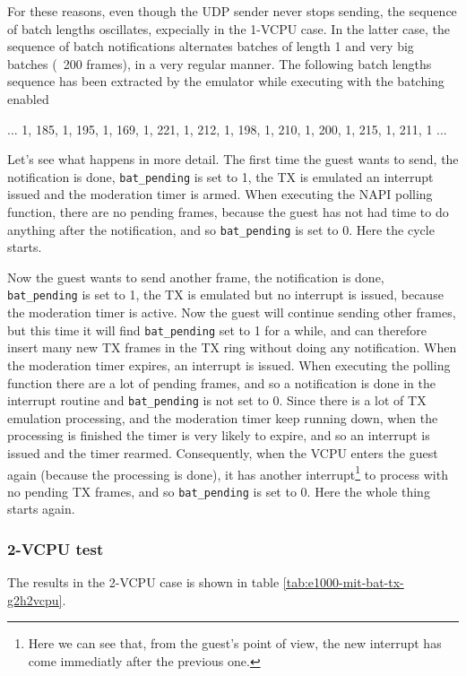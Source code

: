 For these reasons, even though the UDP sender never stops sending, the sequence of batch lengths oscillates, expecially in the 1-VCPU case.
In the latter case, the sequence of batch notifications alternates batches of length 1 and very big batches (~200 frames), in a very 
regular manner. The following batch lengths sequence has been extracted by the emulator while executing with the batching enabled
\begin{center}
... 1, 185, 1, 195, 1, 169, 1, 221, 1, 212, 1, 198, 1, 210, 1, 200, 1, 215, 1, 211, 1 ...
\end{center}

Let's see what happens in more detail. The first time the guest wants to send, the notification is done, \texttt{bat\_pending} is set to 1,
the TX is emulated an interrupt issued and the moderation timer is armed. When executing the NAPI polling function, there are no 
pending frames, because the guest has not had time to do anything after the notification, and so \texttt{bat\_pending} is set to 0.
Here the cycle starts.

Now the guest wants to send another frame, the notification is done, \texttt{bat\_pending} is set to 1, the TX is emulated but no
interrupt is issued, because the moderation timer is active. Now the guest will continue sending other frames, but this time it will
find \texttt{bat\_pending} set to 1 for a while, and can therefore insert many new TX frames in the TX ring without doing any notification.
When the moderation timer expires, an interrupt is issued. When executing the polling function there are a lot of pending frames, and
so a notification is done in the interrupt routine and \texttt{bat\_pending} is not set to 0. Since there is a lot of TX emulation 
processing,
and the moderation timer keep running down, when the processing is finished the timer is very likely to expire, and so an interrupt is
issued and the timer rearmed. Consequently, when the VCPU enters the guest again (because the processing is done), it has another 
interrupt\footnote{Here we can see that, from the guest's point of view, the new interrupt has come immediatly after the previous one.} 
to process with no pending TX frames, and so \texttt{bat\_pending} is set to 0. Here the whole thing starts again.


\subsubsection{2-VCPU test}
The results in the 2-VCPU case is shown in table \ref{tab:e1000-mit-bat-tx-g2h2vcpu}.

